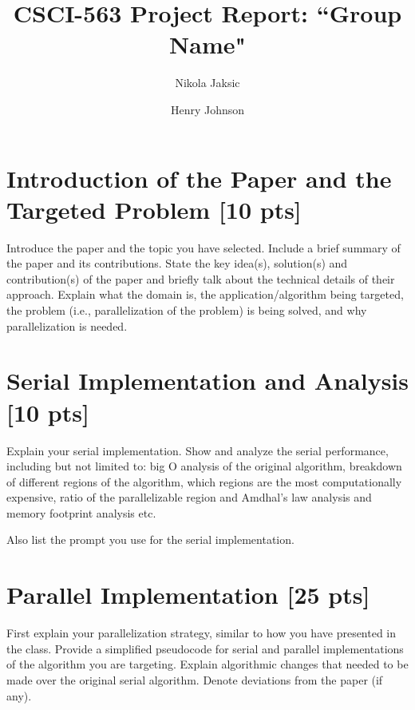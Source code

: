 \documentclass[sigconf,authorversion,nonacm]{acmart}
\begin{document}
\title{CSCI-563 Project Report: ``Group Name"}

\author{Nikola Jaksic}

\author{Henry Johnson}

\maketitle





\section{Introduction of the Paper and the Targeted Problem {\small {[10 pts]}}}
Introduce the paper and the topic you have selected. Include a brief summary of the paper and its contributions. State the key idea(s), solution(s) and contribution(s) of the paper and briefly talk about the technical details of their approach. Explain what the domain is, the application/algorithm being targeted, the problem (i.e., parallelization of the problem) is being solved, and why parallelization is needed. 

\section{Serial Implementation and Analysis {\small {[10 pts]}}}

Explain your serial implementation. Show and analyze the serial performance, including but not limited to:  big O analysis of the original algorithm, breakdown of different regions of the algorithm, which regions are the most computationally expensive, ratio of the parallelizable region and Amdhal’s law analysis and memory footprint analysis etc. 

Also list the prompt you use for the serial implementation.

\section{Parallel Implementation {\small {[25 pts]}}}

First explain your parallelization strategy, similar to how you have presented in the class. Provide a simplified pseudocode for serial and parallel implementations of the algorithm you are targeting. Explain algorithmic changes that needed to be made over the original serial algorithm. Denote deviations from the paper (if any).
\end{document}
